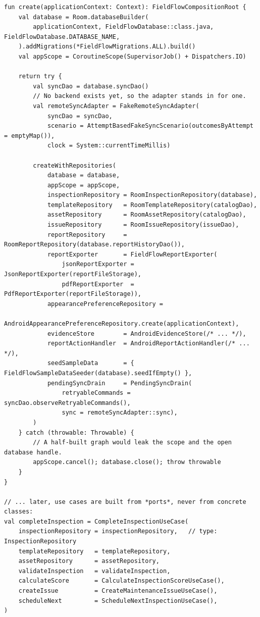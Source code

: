 \documentclass[11pt,a4paper]{article}
\newcommand{\file}[1]{{\small\texttt{#1}}}
\begin{document}
\begin{lstlisting}[caption={\file{FieldFlowCompositionRoot.kt} (abridged) --- the
single point at which "which adapter?'' is answered.}]
fun create(applicationContext: Context): FieldFlowCompositionRoot {
    val database = Room.databaseBuilder(
        applicationContext, FieldFlowDatabase::class.java, FieldFlowDatabase.DATABASE_NAME,
    ).addMigrations(*FieldFlowMigrations.ALL).build()
    val appScope = CoroutineScope(SupervisorJob() + Dispatchers.IO)

    return try {
        val syncDao = database.syncDao()
        // No backend exists yet, so the adapter stands in for one.
        val remoteSyncAdapter = FakeRemoteSyncAdapter(
            syncDao = syncDao,
            scenario = AttemptBasedFakeSyncScenario(outcomesByAttempt = emptyMap()),
            clock = System::currentTimeMillis)

        createWithRepositories(
            database = database,
            appScope = appScope,
            inspectionRepository = RoomInspectionRepository(database),
            templateRepository   = RoomTemplateRepository(catalogDao),
            assetRepository      = RoomAssetRepository(catalogDao),
            issueRepository      = RoomIssueRepository(issueDao),
            reportRepository     = RoomReportRepository(database.reportHistoryDao()),
            reportExporter       = FieldFlowReportExporter(
                jsonReportExporter = JsonReportExporter(reportFileStorage),
                pdfReportExporter  = PdfReportExporter(reportFileStorage)),
            appearancePreferenceRepository =
                AndroidAppearancePreferenceRepository.create(applicationContext),
            evidenceStore        = AndroidEvidenceStore(/* ... */),
            reportActionHandler  = AndroidReportActionHandler(/* ... */),
            seedSampleData       = { FieldFlowSampleDataSeeder(database).seedIfEmpty() },
            pendingSyncDrain     = PendingSyncDrain(
                retryableCommands = syncDao.observeRetryableCommands(),
                sync = remoteSyncAdapter::sync),
        )
    } catch (throwable: Throwable) {
        // A half-built graph would leak the scope and the open database handle.
        appScope.cancel(); database.close(); throw throwable
    }
}

// ... later, use cases are built from *ports*, never from concrete classes:
val completeInspection = CompleteInspectionUseCase(
    inspectionRepository = inspectionRepository,   // type: InspectionRepository
    templateRepository   = templateRepository,
    assetRepository      = assetRepository,
    validateInspection   = validateInspection,
    calculateScore       = CalculateInspectionScoreUseCase(),
    createIssue          = CreateMaintenanceIssueUseCase(),
    scheduleNext         = ScheduleNextInspectionUseCase(),
)
\end{lstlisting}
\end{document}
